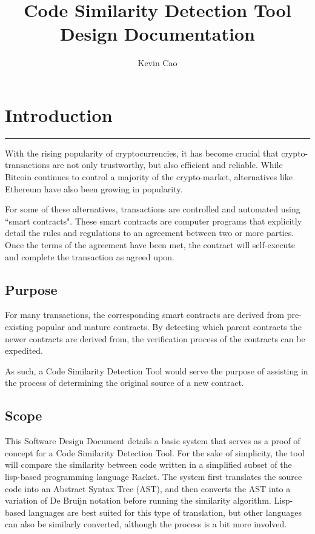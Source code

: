 \documentclass[12pt]{article}
\title{Code Similarity Detection Tool\\
Design Documentation}
\author{Kevin Cao}
\newcommand{\usection}[1]{\section{#1}\hrule\hfill}
\begin{document}
\maketitle

\tableofcontents

\newpage

\usection{Introduction}

With the rising popularity of cryptocurrencies, it has become crucial that crypto-transactions are not only trustworthy, but also efficient and reliable. While Bitcoin continues to control a majority of the crypto-market, alternatives like Ethereum have also been growing in popularity.

\hfill

For some of these alternatives, transactions are controlled and automated using ``smart contracts". These smart contracts are computer programs that explicitly detail the rules and regulations to an agreement between two or more parties. Once the terms of the agreement have been met, the contract will self-execute and complete the transaction as agreed upon.

\subsection{Purpose}
For many transactions, the corresponding smart contracts are derived from pre-existing popular and mature contracts. By detecting which parent contracts the newer contracts are derived from, the verification process of the contracts can be expedited.

\hfill

As such, a Code Similarity Detection Tool would serve the purpose of assisting in the process of determining the original source of a new contract.

\subsection{Scope}

This Software Design Document details a basic system that serves as a proof of concept for a Code Similarity Detection Tool. For the sake of simplicity, the tool will compare the similarity between code written in a simplified subset of the lisp-based programming language Racket. The system first translates the source code into an Abstract Syntax Tree (AST), and then converts the AST into a variation of De Bruijn notation before running the similarity algorithm. Lisp-based languages are best suited for this type of translation, but other languages can also be similarly converted, although the process is a bit more involved.
\end{document}
